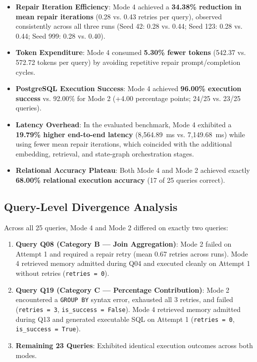 \begin{itemize}
    \item \textbf{Repair Iteration Efficiency}: Mode 4 achieved a \textbf{34.38\% reduction in mean repair iterations} (0.28 vs. 0.43 retries per query), observed consistently across all three runs (Seed 42: 0.28 vs. 0.44; Seed 123: 0.28 vs. 0.44; Seed 999: 0.28 vs. 0.40).
    \item \textbf{Token Expenditure}: Mode 4 consumed \textbf{5.30\% fewer tokens} (542.37 vs. 572.72 tokens per query) by avoiding repetitive repair prompt/completion cycles.
    \item \textbf{PostgreSQL Execution Success}: Mode 4 achieved \textbf{96.00\% execution success} vs. 92.00\% for Mode 2 (+4.00 percentage points; 24/25 vs. 23/25 queries).
    \item \textbf{Latency Overhead}: In the evaluated benchmark, Mode 4 exhibited a \textbf{19.79\% higher end-to-end latency} (8,564.89~ms vs. 7,149.68~ms) while using fewer mean repair iterations, which coincided with the additional embedding, retrieval, and state-graph orchestration stages.
    \item \textbf{Relational Accuracy Plateau}: Both Mode 4 and Mode 2 achieved exactly \textbf{68.00\% relational execution accuracy} (17 of 25 queries correct).
\end{itemize}

\subsection{Query-Level Divergence Analysis}
Across all 25 queries, Mode 4 and Mode 2 differed on exactly two queries:
\begin{enumerate}
    \item \textbf{Query Q08 (Category B --- Join Aggregation)}: Mode 2 failed on Attempt 1 and required a repair retry (mean 0.67 retries across runs). Mode 4 retrieved memory admitted during Q04 and executed cleanly on Attempt 1 without retries (\texttt{retries = 0}).
    \item \textbf{Query Q19 (Category C --- Percentage Contribution)}: Mode 2 encountered a \texttt{GROUP BY} syntax error, exhausted all 3 retries, and failed (\texttt{retries = 3}, \texttt{is\_success = False}). Mode 4 retrieved memory admitted during Q13 and generated executable SQL on Attempt 1 (\texttt{retries = 0}, \texttt{is\_success = True}).
    \item \textbf{Remaining 23 Queries}: Exhibited identical execution outcomes across both modes.
\end{enumerate}

